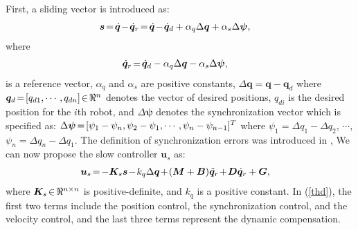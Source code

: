 \documentclass[letterpaper, 10 pt, conference]{ieeeconf}
\begin{document}
First, a sliding vector is introduced as:
\begin{eqnarray}
&\bm s\hspace{-0.05cm}=\hspace{-0.05cm}\dot{\bm
q}\hspace{-0.05cm}-\hspace{-0.05cm}\dot{\bm
q}_r\hspace{-0.05cm}=\hspace{-0.05cm}\dot{\bm
q}\hspace{-0.05cm}-\hspace{-0.05cm}\dot{\bm q}_d+\alpha_q\Delta\bm q+\alpha_s\Delta\bm\psi,\label{imCon1}
\end{eqnarray}
where
\begin{eqnarray}
&\dot{\bm q}_r\hspace{-0.05cm}=\hspace{-0.05cm}\dot{\bm q}_d-\alpha_q\Delta\bm q-\alpha_s\Delta\bm\psi,\label{xo}
\end{eqnarray}
is a reference vector, $\alpha_q$ and $\alpha_s$ are positive constants, $\Delta\bm q=\bm q-\bm q_d$ where $\bm q_d\hspace{-0.05cm}=\hspace{-0.05cm}[q_{d1}, \cdots, q_{dn}]\hspace{-0.05cm}\in\hspace{-0.05cm}\Re^n$ denotes the vector of desired positions, $q_{di}$ is the desired position for the $i$th robot, and $\Delta\bm\psi$ denotes the synchronization vector which is specified as:
$\Delta\bm\psi\hspace{-0.05cm}=\hspace{-0.05cm}[\psi_1-\psi_n, \psi_2-\psi_1, \cdots, \psi_n-\psi_{n-1}]^T$ where $\psi_1=\Delta q_1-\Delta q_2$, $\cdots$, $\psi_n=\Delta q_n-\Delta q_1$. The definition of synchronization errors was introduced in \cite{sdtmech}, We can now propose the slow controller $\bm u_s$ as:
\begin{eqnarray}
&\bm u_s\hspace{-0.05cm}=\hspace{-0.05cm}-\bm K_s\bm
s\hspace{-0.05cm}-\hspace{-0.05cm}k_q\Delta\bm q\hspace{-0.05cm}+\hspace{-0.05cm}(\bm{M}+\bm B)\ddot{\bm
q}_r\hspace{-0.05cm}+\hspace{-0.05cm}\bm D\dot{\bm
q}_r+\bm G,\label{thd}
\end{eqnarray}
where $\bm K_s\hspace{-0.05cm}\in\hspace{-0.05cm}\Re^{n\times n}$ is
positive-definite, and $k_q$ is a positive constant. In (\ref{thd}), the first two terms include the position control, the synchronization control, and the velocity control, and the last three terms represent the dynamic compensation.
\end{document}
